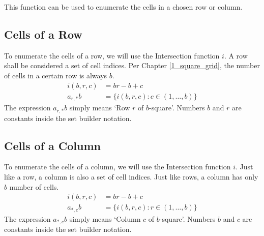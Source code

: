 \documentclass[letterpaper, twoside,12pt]{article}
\begin{document}
    This function can be used to enumerate the cells in a chosen row or column.

    \newpage

    \subsection{Cells of a Row}
    To enumerate the cells of a row, we will use the Intersection function $i$. A row shall be considered a set of cell indices. Per Chapter \ref{1_square_grid}, the number of cells in a certain row is always $b$.
    \begin{equation}
        \begin{split}
            i(b,r,c) &= br - b + c \\
            a_{r,*}b &= \{ i(b,r,c) : c \in (1, \dots, b) \}
        \end{split}
    \end{equation}
    The expression $a_{r,*}b$ simply means `Row $r$ of $b$-square'. Numbers $b$ and $r$ are constants inside the set builder notation.

    \subsection{Cells of a Column}
    To enumerate the cells of a column, we will use the Intersection function $i$. Just like a row, a column is also a set of cell indices. Just like rows, a column has only $b$ number of cells.
    \begin{equation}
        \begin{split}
            i(b,r,c) &= br - b + c \\
            a_{*,c}b &= \{ i(b,r,c) : r \in (1, \dots, b) \}
        \end{split}
    \end{equation}
    The expression $a_{*,c}b$ simply means `Column $c$ of $b$-square'. Numbers $b$ and $c$ are constants inside the set builder notation.
\end{document}
